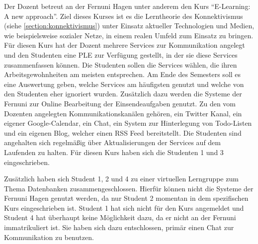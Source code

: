 Der Dozent betreut an der Fernuni Hagen unter anderem den Kurs "`E-Learning: A new approach"'. Ziel dieses Kurses ist es die Lerntheorie des Konnektivismus (siehe \ref{section:konnektivismus}) unter Einsatz aktueller Technologien und Medien, wie beispielsweise sozialer Netze, in einem realen Umfeld zum Einsatz zu bringen.  Für diesen Kurs hat der Dozent mehrere Services zur Kommunikation angelegt und den Studenten eine PLE zur Verfügung gestellt, in der sie diese Services zusammenfassen können. Die Studenten sollen die Services wählen, die ihren Arbeitsgewohnheiten am meisten entsprechen. Am Ende des Semesters soll es eine Auswertung geben, welche Services am häufigsten genutzt und welche von den Studenten eher ignoriert wurden. Zusätzlich dazu werden die Systeme der Fernuni zur Online Bearbeitung der Einsendeaufgaben genutzt. Zu den vom Dozenten angelegten Kommunikationskanälen gehören, ein Twitter Kanal, ein eigener Google-Calendar, ein Chat, ein System zur Hinterlegung von Todo-Listen und ein eigenen Blog, welcher einen RSS Feed bereitstellt. Die Studenten sind angehalten sich regelmäßig über Aktualisierungen der Services auf dem Laufenden zu halten. Für diesen Kurs haben sich die Studenten 1 und 3 eingeschrieben.

Zusätzlich haben sich Student 1, 2 und 4 zu einer virtuellen Lerngruppe zum Thema Datenbanken zusammengeschlossen. Hierfür können nicht die Systeme der Fernuni Hagen genutzt werden, da nur Student 2 momentan in dem spezifischen Kurs eingeschrieben ist. Student 1 hat sich nicht für den Kurs angemeldet und Student 4 hat überhaupt keine Möglichkeit dazu, da er nicht an der Fernuni immatrikuliert ist. Sie haben sich dazu entschlossen, primär einen Chat zur Kommunikation zu benutzen.

